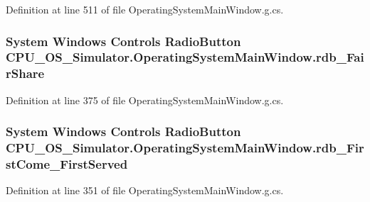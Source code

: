 Definition at line 511 of file Operating\+System\+Main\+Window.\+g.\+cs.

\hypertarget{class_c_p_u___o_s___simulator_1_1_operating_system_main_window_af80c8b728e40265c61586b298e8640ef}{}
\subsubsection[{rdb\+\_\+\+Fair\+Share}]{\setlength{\rightskip}{0pt plus 5cm}System Windows Controls Radio\+Button C\+P\+U\+\_\+\+O\+S\+\_\+\+Simulator.\+Operating\+System\+Main\+Window.\+rdb\+\_\+\+Fair\+Share\hspace{0.3cm}{\ttfamily [package]}}\label{class_c_p_u___o_s___simulator_1_1_operating_system_main_window_af80c8b728e40265c61586b298e8640ef}


Definition at line 375 of file Operating\+System\+Main\+Window.\+g.\+cs.

\hypertarget{class_c_p_u___o_s___simulator_1_1_operating_system_main_window_a929f7f488fb80ae6459510ad3334fddb}{}
\subsubsection[{rdb\+\_\+\+First\+Come\+\_\+\+First\+Served}]{\setlength{\rightskip}{0pt plus 5cm}System Windows Controls Radio\+Button C\+P\+U\+\_\+\+O\+S\+\_\+\+Simulator.\+Operating\+System\+Main\+Window.\+rdb\+\_\+\+First\+Come\+\_\+\+First\+Served\hspace{0.3cm}{\ttfamily [package]}}\label{class_c_p_u___o_s___simulator_1_1_operating_system_main_window_a929f7f488fb80ae6459510ad3334fddb}


Definition at line 351 of file Operating\+System\+Main\+Window.\+g.\+cs.

